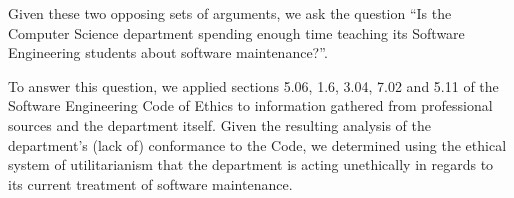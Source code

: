 \documentclass[11pt]{article}
\begin{document}
\begin{multicols}{2}
Given these two opposing sets of arguments, we ask the question ``Is the Computer Science department spending enough time teaching its Software Engineering students about software maintenance?''.

To answer this question, we applied sections 5.06, 1.6, 3.04, 7.02 and 5.11 of the Software Engineering Code of Ethics to information gathered from professional sources and the department itself.  Given the resulting analysis of the department's (lack of) conformance to the Code, we determined using the ethical system of utilitarianism that the department is acting unethically in regards to its current treatment of software maintenance.

\end{multicols}
\newpage

\nocite{*}




\end{document}
